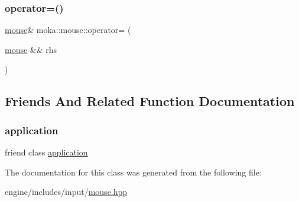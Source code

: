 \mbox{\label{classmoka_1_1mouse_a56e7cf8f2708615ed4727fc126faf1cd}} 
\subsubsection{\texorpdfstring{operator=()}{operator=()}\hspace{0.1cm}{\footnotesize\ttfamily [2/2]}}
{\footnotesize\ttfamily \mbox{\hyperlink{classmoka_1_1mouse}{mouse}}\& moka\+::mouse\+::operator= (\begin{DoxyParamCaption}\item[{\mbox{\hyperlink{classmoka_1_1mouse}{mouse}} \&\&}]{rhs }\end{DoxyParamCaption})\hspace{0.3cm}{\ttfamily [delete]}}



\subsection{Friends And Related Function Documentation}
\mbox{\label{classmoka_1_1mouse_a5b97104505447c42689b96b15027d832}} 
\subsubsection{\texorpdfstring{application}{application}}
{\footnotesize\ttfamily friend class \mbox{\hyperlink{classmoka_1_1application}{application}}\hspace{0.3cm}{\ttfamily [friend]}}



The documentation for this class was generated from the following file\+:\begin{DoxyCompactItemize}
\item 
engine/includes/input/\mbox{\hyperlink{mouse_8hpp}{mouse.\+hpp}}\end{DoxyCompactItemize}
